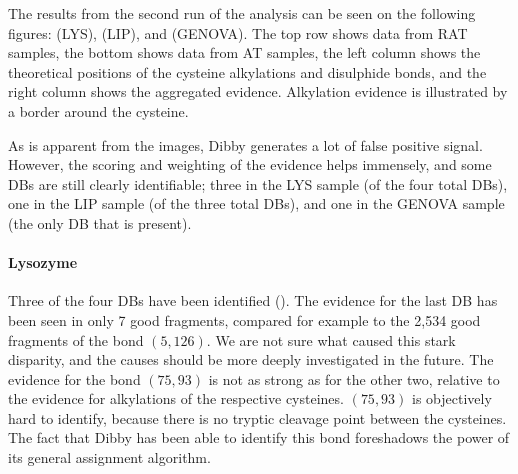 The results from the second run of the analysis can be seen on the following figures:  (LYS),  (LIP), and  (GENOVA). The top row shows data from RAT samples, the bottom shows data from AT samples, the left column shows the theoretical positions of the cysteine alkylations and disulphide bonds, and the right column shows the aggregated evidence. Alkylation evidence is illustrated by a border around the cysteine.

As is apparent from the images, Dibby generates a lot of false positive signal. However, the scoring and weighting of the evidence helps immensely, and some DBs are still clearly identifiable; three in the LYS sample (of the four total DBs), one in the LIP sample (of the three total DBs), and one in the GENOVA sample (the only DB that is present).


\paragraph{Lysozyme} Three of the four DBs have been identified (). The evidence for the last DB has been seen in only 7 good fragments, compared for example to the 2,534 good fragments of the bond \((5, 126)\). We are not sure what caused this stark disparity, and the causes should be more deeply investigated in the future. The evidence for the bond \((75, 93)\) is not as strong as for the other two, relative to the evidence for alkylations of the respective cysteines. \((75, 93)\) is objectively hard to identify, because there is no tryptic cleavage point between the cysteines. The fact that Dibby has been able to identify this bond foreshadows the power of its general assignment algorithm.

